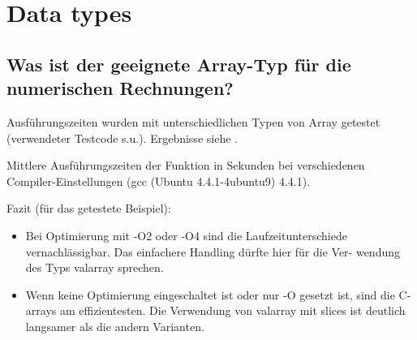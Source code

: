\chapter{Data types}  \label{app:datatypes}
\renewcommand{\tabdir}{appendix/datatypes/tab}
\renewcommand{\figdir}{appendix/datatypes/fig}

\section{Was ist der geeignete Array-Typ für die numerischen Rechnungen?}

Ausführungszeiten wurden mit unterschiedlichen Typen von Array getestet (verwendeter Testcode s.u.). Ergebnisse siehe .

\begin{table*}[htbp]
  \caption{Mittlere Ausführungszeiten der Funktion in Sekunden bei verschiedenen
Compiler-Einstellungen (gcc (Ubuntu 4.4.1-4ubuntu9) 4.4.1). \label{tab:arraytest}}
  
\end{table*}

Fazit (für das getestete Beispiel):
\begin{itemize}
\item Bei Optimierung mit -O2 oder -O4 sind die Laufzeitunterschiede
  vernachlässigbar. Das einfachere Handling dürfte hier für die Ver-
  wendung des Typs valarray sprechen.
\item Wenn keine Optimierung eingeschaltet ist oder nur -O gesetzt ist, sind die
  C-arrays am effizientesten. Die Verwendung von valarray mit slices ist
  deutlich langsamer als die andern Varianten.
\end{itemize}

\begin{shaded}
  \scriptsize
  
\end{shaded}
